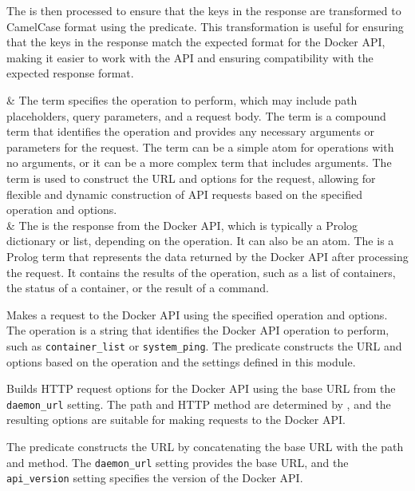 \begin{description}
The  is then processed to ensure that the keys in the response
are transformed to CamelCase format using the 
predicate. This transformation is useful for ensuring that the keys
in the response match the expected format for the Docker API, making
it easier to work with the API and ensuring compatibility with the
expected response format.

\begin{arguments}
 & The  term specifies the operation to perform, which
may include path placeholders, query parameters, and a request body.
The  term is a compound term that identifies the operation and
provides any necessary arguments or parameters for the request. The
 term can be a simple atom for operations with no arguments, or
it can be a more complex term that includes arguments. The  term
is used to construct the URL and options for the request, allowing
for flexible and dynamic construction of API requests based on the
specified operation and options. \\
 & The  is the response from the Docker API, which is
typically a Prolog dictionary or list, depending on the operation.
It can also be an atom. The  is a Prolog term that represents
the data returned by the Docker API after processing the request. It
contains the results of the operation, such as a list of containers,
the status of a container, or the result of a command. \\
\end{arguments}

Makes a request to the Docker API using the specified operation and
options. The operation is a string that identifies the Docker API
operation to perform, such as \verb$container_list$ or \verb$system_ping$. The
predicate constructs the URL and options based on the operation and
the settings defined in this module.

Builds HTTP request options for the Docker API using the base URL from
the \verb$daemon_url$ setting. The path and HTTP method are determined by
, and the resulting options are suitable for making
requests to the Docker API.

The predicate constructs the URL by concatenating the base URL with
the path and method. The \verb$daemon_url$ setting provides the base URL,
and the \verb$api_version$ setting specifies the version of the Docker
API.


\end{description}
